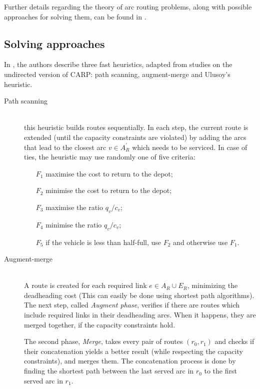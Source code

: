 Further details regarding the theory of arc routing problems, along with
possible approaches for solving them, can be found in \citet{Dror00,Assad95}.





\subsection{Solving approaches}
\label{section:mcarp-approaches}

In \citet{Belenguer06}, the authors describe three fast heuristics, adapted
from studies on the undirected version of CARP: path scanning, augment-merge
and Ulusoy's heuristic. 

\begin{description}
\item[Path scanning] \hfill \\
this heuristic builds routes sequentially. In each step, the current route is
extended (until the capacity constraints are violated) by adding the arcs that
lead to the closest arc $v \in A_R^\prime$ which needs to be serviced. In case
of ties, the heuristic may use randomly one of five criteria:
\begin{itemize}
	\item[$F_1$] maximise the cost to return to the depot;
	\item[$F_2$] minimise the cost to return to the depot;
	\item[$F_3$] maximise the ratio $q_v/c_v$;
	\item[$F_4$] minimise the ratio $q_v/c_v$;
	\item[$F_5$] if the vehicle is less than half-full, use $F_2$ and otherwise use $F_1$.
\end{itemize}

\item[Augment-merge] \hfill \\
A route is created for each required link $e \in A_R \cup E_R$, minimizing the
deadheading cost (This can easily be done using shortest path algorithms). The
next step, called \textit{Augment phase}, verifies if there are routes which
include required links in their deadheading arcs. When it happens, they are
merged together, if the capacity constraints hold.

The second phase, \textit{Merge}, takes every pair of routes $(r_0, r_1)$ and
checks if their concatenation yields a better result (while respecting the
capacity constraints), and merges them. The concatenation process is done by
finding the shortest path between the last served arc in $r_0$ to the first
served arc in $r_1$.


\end{description}
